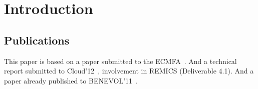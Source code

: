 \section{Introduction}


\subsection{Publications}

This paper is based on a paper submitted to the ECMFA~\cite{ecmfa4clouda}.
And a technical report submitted to Cloud'12~\cite{remics_4_1}, involvement in REMICS (Deliverable 4.1).
And a paper already published to BENEVOL'11~\cite{ mosser-brandtzæg-etal:2011}.
